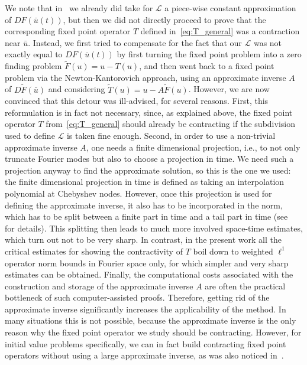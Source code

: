 \documentclass[10pt,a4paper]{article}
\theoremstyle{plain}
\renewcommand{\L}{\mathcal{L}}
\newcommand{\tT}{\tilde{T}}
\newcommand{\bu}{\bar{u}}
\newcommand{\1}{\mathbf{1}}
\begin{document}
We note that in~\cite{BerBreShe24} we already did take for $\L$ a piece-wise constant approximation of $DF(\bu(t))$, but then we did not directly proceed to prove that the corresponding fixed point operator $T$ defined in~\eqref{eq:T_general} was a contraction near $\bu$. Instead, we first tried  to compensate for the fact that our $\L$ was not exactly equal to $DF(\bu(t))$ by first turning the fixed point problem into a zero finding problem $\tilde{F}(u) = u - T(u)$, and then went back to a fixed point problem via the Newton-Kantorovich approach, using an approximate inverse $A$ of $D \tilde{F}(\bu)$ and considering $\tT(u) = u - A\tilde{F}(u)$. 
However, we are now convinced that this detour was ill-advised, for several reasons. First, this reformulation is in fact not necessary, since, as explained above, the fixed point operator $T$ from~\eqref{eq:T_general} should already be contracting if the subdivision used to define $\L$ is taken fine enough. Second, in order to use a non-trivial approximate inverse $A$, one needs a finite dimensional projection, i.e., to not only truncate Fourier modes but also to choose a projection in time. We need such a projection anyway to find the approximate solution, so this is the one we used: the finite dimensional projection in time is defined as taking an interpolation polynomial at Chebyshev nodes. However, once this projection is used for defining the approximate inverse, it also has to be incorporated in the norm, which has to be split between a finite part in time and a tail part in time (see~\cite[Section 3.2]{BerBreShe24} for details). This splitting then leads to much more involved space-time estimates, which turn out not to be very sharp. In contrast, in the present work all the critical estimates for showing the contractivity of $T$ boil down to weighted $\ell^1$ operator norm bounds in Fourier space only, for which simpler and very sharp estimates can be obtained.
Finally, the computational costs associated with the construction and storage of the approximate inverse $A$ are often the practical bottleneck of such computer-assisted proofs. Therefore, getting rid of the approximate inverse significantly increases the applicability of the method. In many situations this is not possible, because the approximate inverse is the only reason why the fixed point operator we study should be contracting. However, for initial value problems specifically, we can in fact build contracting fixed point operators without using a large approximate inverse, as was also noticed in~\cite{DucLesTak25}. 
\end{document}
